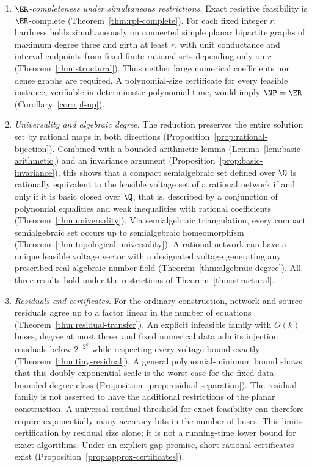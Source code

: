 \begin{enumerate}
\item \emph{$\ER$-completeness under simultaneous restrictions.}
Exact resistive feasibility is $\ER$-complete (Theorem~\ref{thm:rpf-complete}).
For each fixed integer $r$, hardness holds simultaneously on connected
simple planar bipartite graphs of maximum degree three and girth at least
$r$, with unit conductance and interval endpoints from fixed finite rational
sets depending only on $r$ (Theorem~\ref{thm:structural}). Thus neither
large numerical coefficients nor dense graphs are required. A polynomial-size certificate for every feasible instance, verifiable in
deterministic polynomial time, would imply $\NP=\ER$
(Corollary~\ref{cor:rpf-np}).

\item \emph{Universality and algebraic degree.}
The reduction preserves the entire solution set by rational maps in both
directions (Proposition~\ref{prop:rational-bijection}). Combined with a
bounded-arithmetic lemma (Lemma~\ref{lem:basic-arithmetic}) and an invariance
argument (Proposition~\ref{prop:basic-invariance}), this shows that a
compact semialgebraic set defined over $\Q$ is rationally equivalent to the
feasible voltage set of a rational network if and only if it is basic
closed over $\Q$, that is, described by a conjunction of polynomial
equalities and weak inequalities with rational coefficients
(Theorem~\ref{thm:universality}). Via semialgebraic triangulation, every compact
semialgebraic set occurs up to semialgebraic homeomorphism
(Theorem~\ref{thm:topological-universality}).
A rational network can have a unique feasible voltage vector with a
designated voltage generating any prescribed real algebraic number field
(Theorem~\ref{thm:algebraic-degree}). All three results hold under the
restrictions of Theorem~\ref{thm:structural}.

\item \emph{Residuals and certificates.}
For the ordinary construction, network and source residuals agree up to a
factor linear in the number of equations
(Theorem~\ref{thm:residual-transfer}). An explicit infeasible family with
$O(k)$ buses, degree at most three, and fixed numerical data admits
injection residuals below $2^{-2^k}$ while respecting every voltage bound
exactly (Theorem~\ref{thm:tiny-residual}). A general polynomial-minimum
bound shows that this doubly exponential scale is the worst case for the
fixed-data bounded-degree class (Proposition~\ref{prop:residual-separation}).
The residual family is not asserted to have the additional restrictions of
the planar construction. A universal residual threshold for exact
feasibility can therefore require exponentially many accuracy bits in the
number of buses. This limits certification by residual size alone; it is
not a running-time lower bound for exact algorithms. Under an explicit gap
promise, short rational certificates exist
(Proposition~\ref{prop:approx-certificates}).


\end{enumerate}
